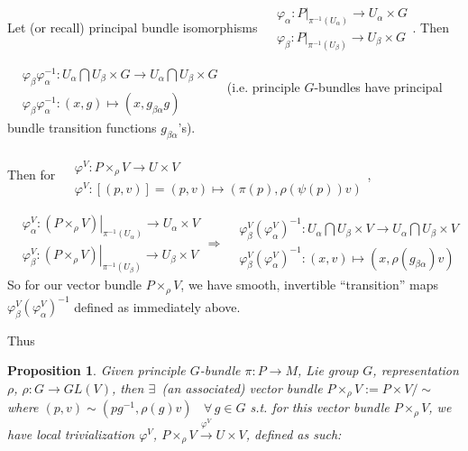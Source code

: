 \documentclass[10pt]{amsart}
\newtheorem{proposition}{Proposition}
\begin{document}
\begin{multicols*}{2}
Let (or recall) principal bundle isomorphisms $\begin{aligned} & \quad \\
  & \varphi_{\alpha} : \left. P \right|_{\pi^{-1}(U_{\alpha})} \to U_{\alpha} \times G \\
  & \varphi_{\beta} : \left. P \right|_{\pi^{-1}(U_{\beta})} \to U_{\beta} \times G \\
\end{aligned}$.  Then $\begin{aligned} & \quad \\
  & \varphi_{\beta} \varphi_{\alpha}^{-1} : U_{\alpha} \bigcap U_{\beta} \times G \to U_{\alpha} \bigcap U_{\beta} \times G \\
  & \varphi_{\beta} \varphi_{\alpha}^{-1} : (x,g) \mapsto (x,g_{\beta \alpha} g) \end{aligned}$ (i.e. principle $G$-bundles have principal bundle transition functions $g_{\beta\alpha}$'s).  

Then for $\begin{aligned} & \quad \\
  & \varphi^V :P\times_{\rho}V \to U\times V \\
  & \varphi^V: [(p,v)] = (p,v) \mapsto (\pi(p), \rho(\psi(p))v ) \end{aligned}$, 

\[
\begin{aligned}
  & \left. \varphi_{\alpha}^V :( P \times_{\rho} V ) \right|_{\pi^{-1}(U_{\alpha})} \to U_{\alpha} \times V \\ 
  & \left. \varphi_{\beta}^V :( P \times_{\rho} V ) \right|_{\pi^{-1}(U_{\beta})} \to U_{\beta} \times V 
\end{aligned}
 \Longrightarrow 
\begin{aligned} 
  & \varphi_{\beta}^V (\varphi_{\alpha}^V)^{-1} : U_{\alpha} \bigcap U_{\beta} \times V \to U_{\alpha} \bigcap U_{\beta} \times V \\ 
  &  \varphi_{\beta}^V (\varphi_{\alpha}^V)^{-1}: (x,v) \mapsto (x,\rho(g_{\beta \alpha}) v)
\end{aligned}
\]
So for our vector bundle $P\times_{\rho}V$, we have smooth, invertible ``transition'' maps $\varphi_{\beta}^V (\varphi_{\alpha}^V)^{-1}$ defined as immediately above.  

Thus

\begin{proposition}
  Given principle $G$-bundle $\pi: P \to M$, Lie group $G$, representation $\rho$, $\rho:G \to GL(V)$, then $\exists \, $ (an associated) vector bundle $P\times_{\rho}V := P\times V/\sim$ where $(p,v) \sim (pg^{-1},\rho(g)v)$ \, $\forall \, g \in G$ s.t. for this vector bundle $P\times_{\rho}V$, we have local trivialization $\varphi^V$, $P\times_{\rho}V \xrightarrow{ \varphi^V} U\times V$, defined as such:


\end{proposition}
\end{multicols*}
\end{document}
